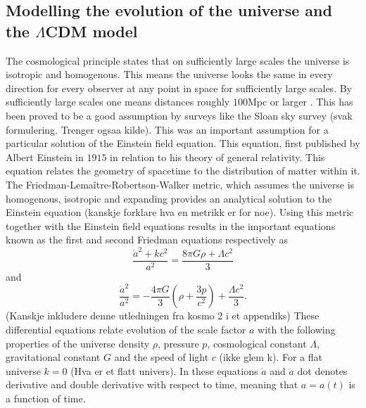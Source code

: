 \subsection{Modelling the evolution of the universe and the $\Lambda$CDM model}
The cosmological principle states that on sufficiently
large scales the universe is isotropic and homogenous. This means the universe
looks the same in every direction for every observer at any point in space for
sufficiently large scales. By sufficiently large scales one means
distances roughly $100$Mpc or larger \cite[p.~12]{ryden2017introduction}. This has been proved to be a good
assumption by surveys like the Sloan sky survey (svak formulering. Trenger ogsaa kilde). This was an important assumption
for a particular solution of the Einstein field equation. This equation, first published by
Albert Einstein in $1915$ in relation to his theory of general relativity. This equation
relates the geometry of spacetime to the distribution of matter within it.
The Friedman-Lemaître-Robertson-Walker metric, which assumes the universe is
homogenous, isotropic and expanding provides an analytical solution to the
Einstein equation (kanskje forklare hva en metrikk er for noe). Using this
metric together with the Einstein field equations results in the important
equations known as the first and second Friedman equations respectively as
\begin{equation}
    \frac{\dot{a}^2 + kc^2}{a^2} = \frac{8\pi G\rho + \Lambda c^2}{3}
\end{equation}
and
\begin{equation}
    \frac{\ddot{a}^2}{a^2} = -\frac{4\pi G}{3}(\rho + \frac{3p}{c^2}) + \frac{\Lambda c^2}{3}.
\end{equation}
(Kanskje inkludere denne utledningen fra kosmo 2 i et appendiks)
These differential equations relate evolution of the scale factor $a$ with the
following properties of the universe density $\rho$, pressure $p$, cosmological constant $\Lambda$, gravitational
constant $G$ and the speed of light $c$ (ikke glem k). For a flat universe $k=0$
(Hva er et flatt univers). In these equations $\dot{a}$ and $\ddot{a}$ dot denotes
derivative and double derivative with respect to time, meaning that $a=a(t)$ is a
function of time. \\

